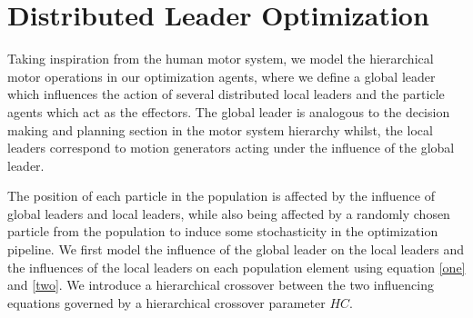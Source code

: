 \documentclass[conference]{IEEEtran}
\begin{document}
%				

\section{Distributed Leader Optimization}
Taking inspiration from the human motor system, we model the hierarchical motor operations in our optimization agents, where we define a global leader which influences the action of several distributed local leaders and the particle agents which act as the effectors. The global leader is analogous to the decision making and planning section in the motor system hierarchy whilst, the local leaders correspond to motion generators acting under the influence of the  global leader.

The position of each particle in the population is affected by the influence of global leaders and local leaders, while also being affected by a randomly chosen particle from the population to induce some stochasticity in the optimization pipeline. We first model the influence of the global leader on the local leaders and the influences of the local leaders  on each population element using equation \eqref{one} and \eqref{two}. We introduce a hierarchical crossover between the two influencing equations governed by a hierarchical crossover parameter $HC$.
\end{document}
